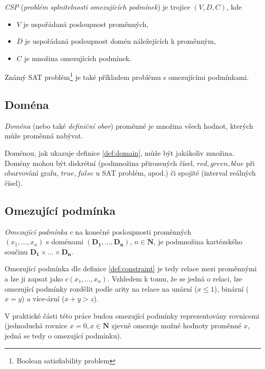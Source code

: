 \begin{definition}
\label{def:csp}
\emph{CSP} (\emph{problém splnitelnosti omezujících podmínek}) je trojice $(V, D, C)$, kde
\begin{itemize}
  \item $V$ je uspořádaná posloupnost proměnných,
  \item $D$ je uspořádaná posloupnost domén náležejících k proměnným,
  \item $C$ je množina omezujících podmínek.
\end{itemize}
\end{definition}

Známý SAT problém\footnote{Boolean satisfiability problem} je také příkladem problému s omezujícími podmínkami.

\subsection{Doména}
\begin{definition}
\label{def:domain}
\emph{Doména} (nebo také \emph{definiční obor}) proměnné je množina všech hodnot, kterých může proměnná nabývat.
\end{definition}

Doménou, jak ukazuje definice \ref{def:domain}, může být jakákoliv množina. Domény mohou být diskrétní (podmnožina přirozených čísel, ${red, green, blue}$ při obarvování grafu, ${true, false}$ u SAT problém, apod.) či spojité (interval reálných čísel).


\subsection{Omezující podmínka}
\begin{definition}
\label{def:constraint}
\emph{Omezující podmínka} $c$ na konečné posloupnosti proměnných\\$(x_1, \dots, x_n)$ s doménami $(\boldsymbol{D_1}, \dots, \boldsymbol{D_n})$, $n \in \boldsymbol{N}$, je podmnožina kartézského součinu $\boldsymbol{D_1} \times \dots \times \boldsymbol{D_n}$.
\end{definition}

Omezující podmínka dle definice \ref{def:constraint} je tedy relace mezi proměnnými a lze ji zapsat jako $c(x_1, \dots, x_n)$. Vzhledem k tomu, že se jedná o relaci, lze omezující podmínky rozdělit podle arity na relace na unární ($x \leq 1$), binární ($x = y$) a více-ární ($x + y > z $).

V praktické části této práce budou omezující podmínky reprezentovány rovnicemi (jednoduchá rovnice $x = 0, x \in \boldsymbol{N}$ zjevně omezuje možné hodnoty proměnné $x$, jedná se tedy o omezující podmínku).

